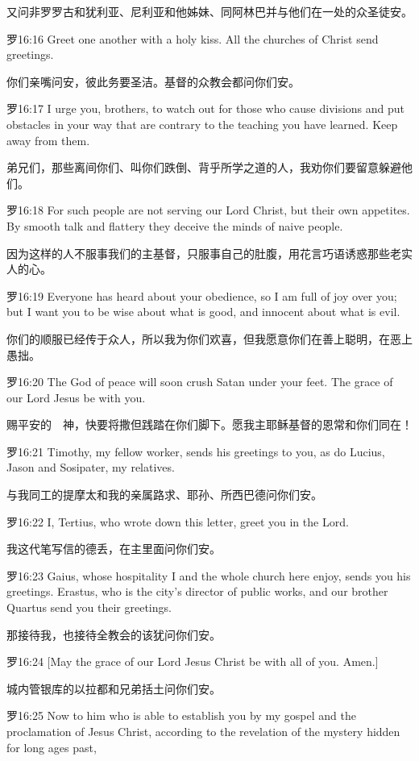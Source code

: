 \documentclass[a4paper,11pt,onecolumn,twoside]{ctexart}
\begin{document}
\begin{multicols}{2}
 又问非罗罗古和犹利亚、尼利亚和他姊妹、同阿林巴并与他们在一处的众圣徒安。


 罗16:16
 Greet one another with a holy kiss. All the churches of Christ send greetings.

 你们亲嘴问安，彼此务要圣洁。基督的众教会都问你们安。


 罗16:17
 I urge you, brothers, to watch out for those who cause divisions and put obstacles in your way that are contrary to the teaching you have learned. Keep away from them.

 弟兄们，那些离间你们、叫你们跌倒、背乎所学之道的人，我劝你们要留意躲避他们。


 罗16:18
 For such people are not serving our Lord Christ, but their own appetites. By smooth talk and flattery they deceive the minds of naive people.

 因为这样的人不服事我们的主基督，只服事自己的肚腹，用花言巧语诱惑那些老实人的心。


 罗16:19
 Everyone has heard about your obedience, so I am full of joy over you; but I want you to be wise about what is good, and innocent about what is evil.

 你们的顺服已经传于众人，所以我为你们欢喜，但我愿意你们在善上聪明，在恶上愚拙。


 罗16:20
 The God of peace will soon crush Satan under your feet. The grace of our Lord Jesus be with you.

 赐平安的　神，快要将撒但践踏在你们脚下。愿我主耶稣基督的恩常和你们同在！


 罗16:21
 Timothy, my fellow worker, sends his greetings to you, as do Lucius, Jason and Sosipater, my relatives.

 与我同工的提摩太和我的亲属路求、耶孙、所西巴德问你们安。


 罗16:22
 I, Tertius, who wrote down this letter, greet you in the Lord.

 我这代笔写信的德丢，在主里面问你们安。


 罗16:23
 Gaius, whose hospitality I and the whole church here enjoy, sends you his greetings. Erastus, who is the city's director of public works, and our brother Quartus send you their greetings.

 那接待我，也接待全教会的该犹问你们安。


 罗16:24
 [May the grace of our Lord Jesus Christ be with all of you. Amen.]

 城内管银库的以拉都和兄弟括土问你们安。


 罗16:25
 Now to him who is able to establish you by my gospel and the proclamation of Jesus Christ, according to the revelation of the mystery hidden for long ages past,


\end{multicols}
\end{document}
